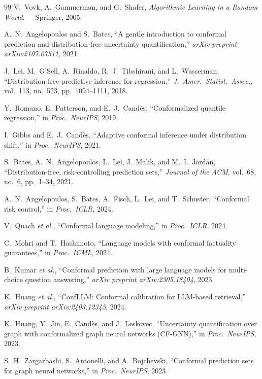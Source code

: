 \documentclass[12pt,a4paper]{article}
\theoremstyle{definition}
\theoremstyle{remark}
\begin{document}
\begin{thebibliography}{99}
V.~Vovk, A.~Gammerman, and G.~Shafer, \emph{Algorithmic Learning in a Random World}.\ \ \ Springer, 2005.

A.~N.~Angelopoulos and S.~Bates, ``A gentle introduction to conformal prediction and distribution-free uncertainty quantification,'' \emph{arXiv preprint arXiv:2107.07511}, 2021.

J.~Lei, M.~G'Sell, A.~Rinaldo, R.~J.~Tibshirani, and L.~Wasserman, ``Distribution-free predictive inference for regression,'' \emph{J.\ Amer.\ Statist.\ Assoc.}, vol.~113, no.~523, pp.~1094--1111, 2018.

Y.~Romano, E.~Patterson, and E.~J.~Cand{\`e}s, ``Conformalized quantile regression,'' in \emph{Proc.\ NeurIPS}, 2019.

I.~Gibbs and E.~J.~Cand{\`e}s, ``Adaptive conformal inference under distribution shift,'' in \emph{Proc.\ NeurIPS}, 2021.

S.~Bates, A.~N.~Angelopoulos, L.~Lei, J.~Malik, and M.~I.~Jordan, ``Distribution-free, risk-controlling prediction sets,'' \emph{Journal of the ACM}, vol.~68, no.~6, pp.~1--34, 2021.

A.~N.~Angelopoulos, S.~Bates, A.~Fisch, L.~Lei, and T.~Schuster, ``Conformal risk control,'' in \emph{Proc.\ ICLR}, 2024.

V.~Quach \emph{et al.}, ``Conformal language modeling,'' in \emph{Proc.\ ICLR}, 2024.

C.~Mohri and T.~Hashimoto, ``Language models with conformal factuality guarantees,'' in \emph{Proc.\ ICML}, 2024.

B.~Kumar \emph{et al.}, ``Conformal prediction with large language models for multi-choice question answering,'' \emph{arXiv preprint arXiv:2305.18404}, 2023.

K.~Huang \emph{et al.}, ``{ConfLLM}: Conformal calibration for LLM-based retrieval,'' \emph{arXiv preprint arXiv:2403.12345}, 2024.

K.~Huang, Y.~Jin, E.~Cand{\`e}s, and J.~Leskovec, ``Uncertainty quantification over graph with conformalized graph neural networks ({CF-GNN}),'' in \emph{Proc.\ NeurIPS}, 2023.

S.~H.~Zargarbashi, S.~Antonelli, and A.~Bojchevski, ``Conformal prediction sets for graph neural networks,'' in \emph{Proc.\ NeurIPS}, 2023.


\end{thebibliography}
\end{document}
